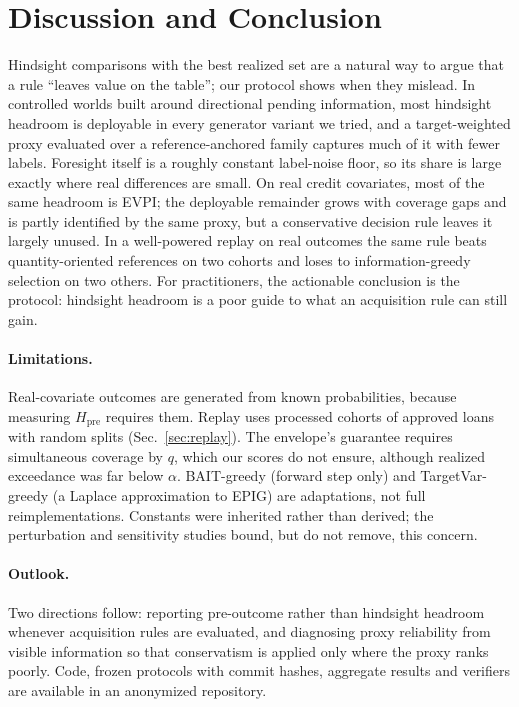 \documentclass[runningheads]{llncs}
\begin{document}
\section{Discussion and Conclusion}
\label{sec:conclusion}
Hindsight comparisons with the best realized set are a natural way to argue that a rule ``leaves value on the table''; our protocol shows when they mislead. In controlled worlds built around directional pending information, most hindsight headroom is deployable in every generator variant we tried, and a target-weighted proxy evaluated over a reference-anchored family captures much of it with fewer labels. Foresight itself is a roughly constant label-noise floor, so its share is large exactly where real differences are small. On real credit covariates, most of the same headroom is EVPI; the deployable remainder grows with coverage gaps and is partly identified by the same proxy, but a conservative decision rule leaves it largely unused. In a well-powered replay on real outcomes the same rule beats quantity-oriented references on two cohorts and loses to information-greedy selection on two others. For practitioners, the actionable conclusion is the protocol: hindsight headroom is a poor guide to what an acquisition rule can still gain.

\paragraph{Limitations.} Real-covariate outcomes are generated from known probabilities, because measuring $H_{\mathrm{pre}}$ requires them. Replay uses processed cohorts of approved loans with random splits (Sec.~\ref{sec:replay}). The envelope's guarantee requires simultaneous coverage by $q$, which our scores do not ensure, although realized exceedance was far below $\alpha$. BAIT-greedy (forward step only) and TargetVar-greedy (a Laplace approximation to EPIG) are adaptations, not full reimplementations. Constants were inherited rather than derived; the perturbation and sensitivity studies bound, but do not remove, this concern.

\paragraph{Outlook.} Two directions follow: reporting pre-outcome rather than hindsight headroom whenever acquisition rules are evaluated, and diagnosing proxy reliability from visible information so that conservatism is applied only where the proxy ranks poorly. Code, frozen protocols with commit hashes, aggregate results and verifiers are available in an anonymized repository.



\end{document}
